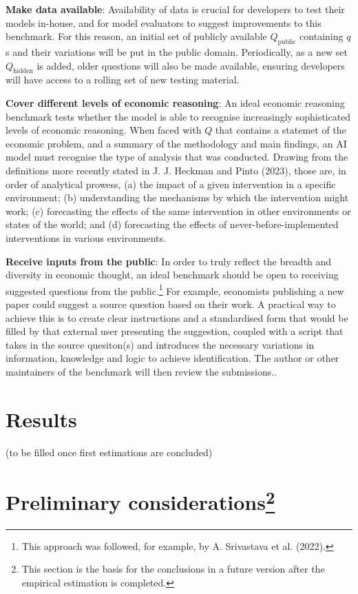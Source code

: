 \documentclass[
]{article}
\begin{document}
\textbf{Make data available}: Availability of data is crucial for
developers to test their models in-house, and for model evaluators to
suggest improvements to this benchmark. For this reason, an initial set
of publicly available \(Q_{\text{public}}\) containing \(q\)s and their
variations will be put in the public domain. Periodically, as a new set
\(Q_{\text{hidden}}\) is added, older questions will also be made
available, ensuring developers will have access to a rolling set of new
testing material.

\textbf{Cover different levels of economic reasoning}: An ideal economic
reasoning benchmark tests whether the model is able to recognise
increasingly sophisticated levels of economic reasoning. When faced with
\(Q\) that contains a statemet of the economic problem, and a summary of
the methodology and main findings, an AI model must recognise the type
of analysis that was conducted. Drawing from the definitions more
recently stated in J. J. Heckman and Pinto (2023), those are, in order
of analytical prowess, (a) the impact of a given intervention in a
specific environment; (b) understanding the mechanisms by which the
intervention might work; (c) forecasting the effects of the same
intervention in other environments or states of the world; and (d)
forecasting the effects of never-before-implemented interventions in
various environments.

\textbf{Receive inputs from the public}: In order to truly reflect the
breadth and diversity in economic thought, an ideal benchmark should be
open to receiving suggested questions from the public.\footnote{This
  approach was followed, for example, by A. Srivastava et al. (2022).}
For example, economists publishing a new paper could suggest a source
question based on their work. A practical way to achieve this is to
create clear instructions and a standardised form that would be filled
by that external user presenting the suggestion, coupled with a script
that takes in the source quesiton(s) and introduces the necessary
variations in information, knowledge and logic to achieve
identification. The author or other maintainers of the benchmark will
then review the submissions..

\section{Results}\label{results}

(to be filled once first estimations are concluded)

\section[Preliminary considerations]{\texorpdfstring{Preliminary
considerations\footnote{This section is the basis for the conclusions in
  a future version after the empirical estimation is completed.}}{Preliminary considerations}}\label{preliminary-considerationsconcl}
\end{document}
